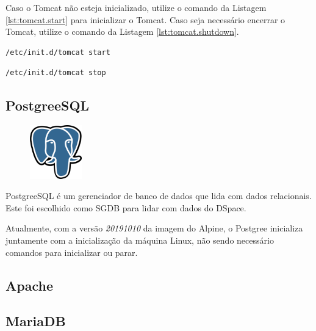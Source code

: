 Caso o Tomcat não esteja inicializado, utilize o comando da Listagem \ref{lst:tomcat.start} para inicializar o Tomcat. Caso seja necessário encerrar o Tomcat, utilize o comando da Listagem \ref{lst:tomcat.shutdown}.

\begin{lstlisting}[language=bash, label=lst:tomcat.start, caption=Inicializando Tomcat.]
    /etc/init.d/tomcat start
\end{lstlisting}

\begin{lstlisting}[language=bash, label=lst:tomcat.shutdown, caption=Encerrando Tomcat.]
    /etc/init.d/tomcat stop
\end{lstlisting}

\subsection{PostgreeSQL}\label{postgree}
\begin{figure} %
    \centering
    \includegraphics[width=0.2\textwidth]{../images/postgree.png}
\end{figure}
PostgreeSQL é um gerenciador de banco de dados que lida com dados relacionais. Este foi escolhido como SGDB para lidar com dados do DSpace.

Atualmente, com a versão \textit{20191010} da imagem do Alpine, o Postgree inicializa juntamente com a inicialização da máquina Linux, não sendo necessário comandos para inicializar ou parar.


\subsection{Apache}\label{apache}

 \blindtext

 \blindtext

 \blindtext

\subsection{MariaDB}\label{mariadb}

